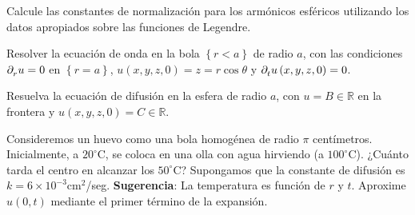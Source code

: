 \question

Calcule las constantes de normalización para los armónicos esféricos
utilizando los datos apropiados sobre las funciones de Legendre.

\question

Resolver la ecuación de onda en la bola $\left\{r<a\right\}$ de radio
$a$, con las condiciones $\difcp{u}{r}=0$ en $\left\{r=a\right\}$,
$u\left(x,y,z,0\right)=z=r\cos\theta$ y
\begin{math}
	\difcp{u}{t}\left(x,y,z,0\right)=0
\end{math}.

\question

Resuelva la ecuación de difusión en la esfera de radio $a$, con
$u=B\in\mathbb{R}$ en la frontera y
\begin{math}
	u\left(x,y,z,0\right)=
	C\in\mathbb{R}
\end{math}.

\question

Consideremos un huevo como una bola homogénea de radio $\pi$
centímetros.
Inicialmente, a $20^{\circ}$C, se coloca en una olla con agua
hirviendo (a $100^{\circ}$C).
¿Cuánto tarda el centro en alcanzar los $50^{\circ}$C?
Supongamos que la constante de difusión es
$k=6\times 10^{-3}$cm$^{2}$/seg.
\textbf{Sugerencia}: La temperatura es función de $r$ y $t$.
Aproxime $u\left(0,t\right)$ mediante el primer término de la
expansión.

\question


\question

